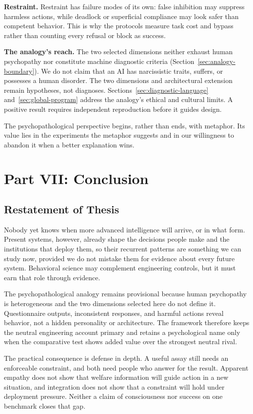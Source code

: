 \documentclass{article}
\begin{document}
\textbf{Restraint.} Restraint has failure modes of its own: false inhibition may suppress harmless actions, while deadlock or superficial compliance may look safer than competent behavior. This is why the protocols measure task cost and bypass rather than counting every refusal or block as success.

\textbf{The analogy's reach.} The two selected dimensions neither exhaust human psychopathy nor constitute machine diagnostic criteria (Section~\ref{sec:analogy-boundary}). We do not claim that an AI has narcissistic traits, suffers, or possesses a human disorder. The two dimensions and architectural extension remain hypotheses, not diagnoses. Sections~\ref{sec:diagnostic-language} and~\ref{sec:global-program} address the analogy's ethical and cultural limits. A positive result requires independent reproduction before it guides design.

The psychopathological perspective begins, rather than ends, with metaphor. Its value lies in the experiments the metaphor suggests and in our willingness to abandon it when a better explanation wins.
\section{Part VII: Conclusion}
\subsection{Restatement of Thesis}
Nobody yet knows when more advanced intelligence will arrive, or in what form. Present systems, however, already shape the decisions people make and the institutions that deploy them, so their recurrent patterns are something we can study now, provided we do not mistake them for evidence about every future system. Behavioral science may complement engineering controls, but it must earn that role through evidence.

The psychopathological analogy remains provisional because human psychopathy is heterogeneous and the two dimensions selected here do not define it. Questionnaire outputs, inconsistent responses, and harmful actions reveal behavior, not a hidden personality or architecture. The framework therefore keeps the neutral engineering account primary and retains a psychological name only when the comparative test shows added value over the strongest neutral rival.

The practical consequence is defense in depth. A useful assay still needs an enforceable constraint, and both need people who answer for the result. Apparent empathy does not show that welfare information will guide action in a new situation, and integration does not show that a constraint will hold under deployment pressure. Neither a claim of consciousness nor success on one benchmark closes that gap.
\end{document}
